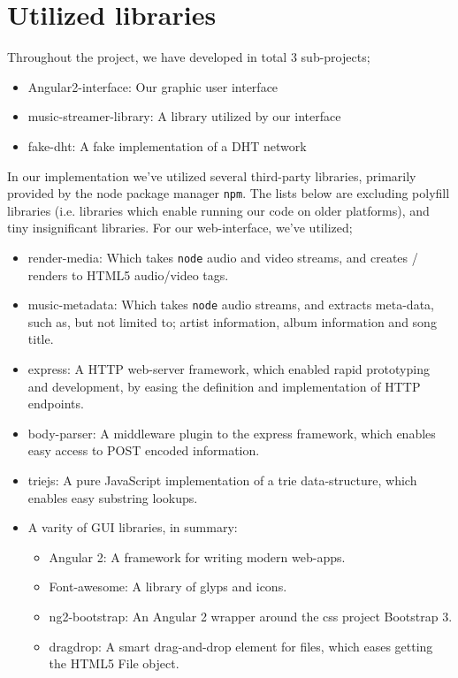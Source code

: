 \section{Utilized libraries}
\label{sec:libraries}
Throughout the project, we have developed in total 3 sub-projects;
\begin{itemize}
\item Angular2-interface: Our graphic user interface
\item music-streamer-library: A library utilized by our interface
\item fake-dht: A fake implementation of a \acs{DHT} network
\end{itemize}
In our implementation we've utilized several third-party libraries, primarily
provided by the node package manager \verb|npm|. The lists below are excluding
polyfill libraries (i.e. libraries which enable running our code on older
platforms), and tiny insignificant libraries.
\newline\newline
For our web-interface, we've utilized;
\begin{itemize}
\item render-media: Which takes \verb|node| audio and video streams, and
        creates / renders to \acs{HTML}5 audio/video tags.
\item music-metadata: Which takes \verb|node| audio streams, and extracts
        meta-data, such as, but not limited to; artist information, album 
        information and song title.
\item express: A \acs{HTTP} web-server framework, which enabled rapid prototyping and
        development, by easing the definition and implementation of \acs{HTTP} endpoints.
\item body-parser: A middleware plugin to the express framework, which enables 
        easy access to POST encoded information.
\item triejs: A pure JavaScript implementation of a trie data-structure, which 
        enables easy substring lookups.
\item A varity of \acs{GUI} libraries, in summary:
    \begin{itemize}
    \item Angular 2: A framework for writing modern web-apps.
    \item Font-awesome: A library of glyps and icons.
    \item ng2-bootstrap: An Angular 2 wrapper around the css project Bootstrap 3.
    \item dragdrop: A smart drag-and-drop element for files, which eases getting
            the \acs{HTML}5 File object.
    \end{itemize}
\end{itemize}
